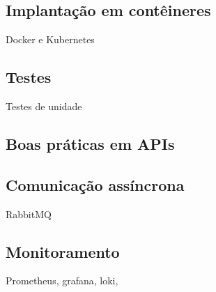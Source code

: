 \subsection*{Implantação em contêineres}
Docker e Kubernetes

\subsection*{Testes}
Testes de unidade

\subsection*{Boas práticas em APIs}

\subsection*{Comunicação assíncrona}
RabbitMQ

\subsection*{Monitoramento}
Prometheus, grafana, loki,